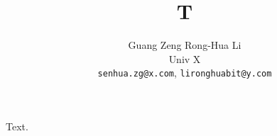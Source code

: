\documentclass{article}
\begin{document}
\title{T}
\author{Guang Zeng \quad Rong-Hua Li\\ Univ X\\ \texttt{senhua.zg@x.com}, \texttt{lironghuabit@y.com}}
\maketitle
Text.
\end{document}
